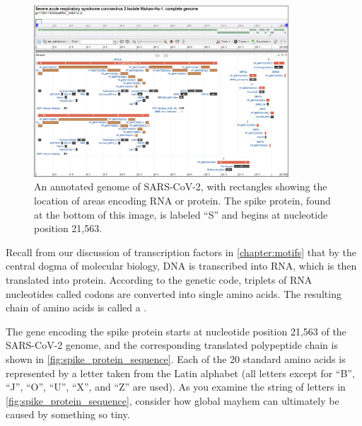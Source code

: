 \begin{figure}[h]
	\centering
	\mySfFamily
	\includegraphics[width = 0.85\textwidth]{../images/SARSCoV2Annotation.png}
	\caption{An annotated genome of SARS-CoV-2, with rectangles showing the location of areas encoding RNA or protein. The spike protein, found at the bottom of this image, is labeled ``S'' and begins at nucleotide position 21,563.}
	\label{fig:SARSCoV2Annotation}
\end{figure}

Recall from our discussion of transcription factors in \autoref{chapter:motifs} that by the central dogma of molecular biology, DNA is transcribed into RNA, which is then translated into protein. According to the genetic code, triplets of RNA nucleotides called codons are converted into single amino acids. The resulting chain of amino acids is called a .\\

\begin{note}\end{note}

The gene encoding the spike protein starts at nucleotide position 21,563 of the SARS-CoV-2 genome, and the corresponding translated polypeptide chain is shown in \autoref{fig:spike_protein_sequence}. Each of the 20 standard amino acids is represented by a letter taken from the Latin alphabet (all letters except for ``B'', ``J'', ``O'', ``U'', ``X'', and ``Z'' are used). As you examine the string of letters in \autoref{fig:spike_protein_sequence}, consider how global mayhem can ultimately be caused by something so tiny.

